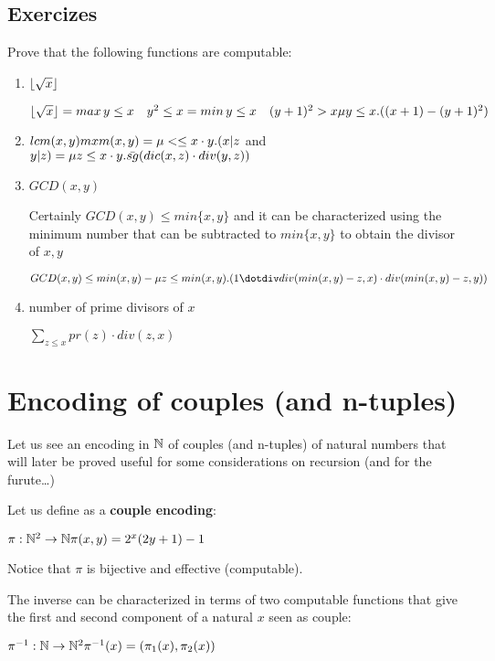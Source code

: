 \subsection{Exercizes}
Prove that the following functions are computable:

\begin{enumerate}[label=\alph*)]
\item $\lfloor\sqrt{x}\rfloor$
  
  $\lfloor\sqrt{x}\rfloor = max\, y\leq x \quad y^2 \leq x\\
  = min \, y \leq x \quad (y+1)^2 > x\\
  \mu y\leq x. ((x+1)-(y+1)^2)$
\item $lcm(x,y)\\
  mxm(x,y) = \mu < \leq x\cdot y . (x|z $ and $ y|z)\\
  = \mu z \leq x\cdot y. \bar{sg}(dic(x,z)\cdot div(y,z))$
\item $GCD(x,y)$
  
  Certainly $GCD(x,y)\leq min\{x,y\}$ and it can be characterized using the minimum number that can be subtracted to $min\{x,y\}$ to obtain the divisor of $x,y$

  $GCD(x,y)\leq min(x,y)-\mu z\leq min(x,y).(1\dotdiv div(min(x,y)-z,x)\cdot div(min(x,y)-z, y))$
\item number of prime divisors of $x$

  $\sum_{z\leq x} pr(z)\cdot div(z,x)$
\end{enumerate}

\section{Encoding of couples (and n-tuples)}

Let us see an encoding in $\mathbb{N}$ of couples (and n-tuples) of natural numbers that will later be proved useful for some considerations on recursion (and for the furute\dots)

Let us define as a \textbf{couple encoding}:

$\pi: \mathbb{N}^2\rightarrow\mathbb{N}\\
\\
\pi(x,y) = 2^x(2y+1)-1$

Notice that $\pi$ is bijective and effective (computable).

The inverse can be characterized in terms of two computable functions that give the first and second component of a natural $x$ seen as couple:

$\pi^{-1}:\mathbb{N}\rightarrow\mathbb{N}^2\\
\\
\pi^{-1}(x) = (\pi_1(x),\pi_2(x))$

